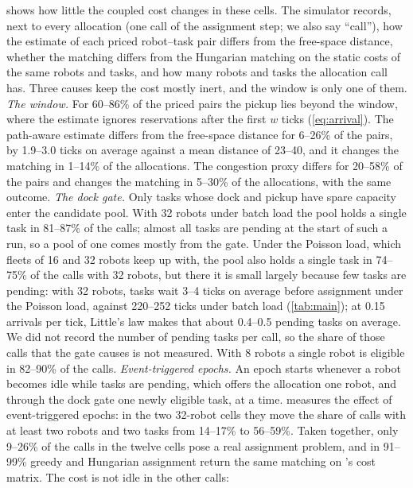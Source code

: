
 shows how little the coupled cost changes in these
cells. The simulator records, next to every allocation (one call of the assignment step; we also say
``call''), how the estimate of
each priced robot--task pair differs from the free-space distance, whether
the matching differs from the Hungarian matching on the static costs of the
same robots and tasks, and how many robots and tasks the allocation call has.
Three causes keep the cost mostly inert, and the window is only one of them.
\emph{The window.} For 60--86\% of the priced pairs the pickup lies
beyond the window, where the estimate ignores reservations after the first
$w$ ticks (\cref{eq:arrival}). The path-aware estimate differs from the
free-space distance for 6--26\% of the pairs, by 1.9--3.0 ticks on average
against a mean distance of 23--40, and it changes the matching in 1--14\% of
the allocations. The congestion proxy differs for 20--58\% of the pairs and
changes the matching in 5--30\% of the allocations, with the same outcome.
\emph{The dock gate.} Only tasks whose dock and pickup have spare
capacity enter the candidate pool. With 32 robots under batch load the pool holds
a single task in 81--87\% of the calls; almost all tasks are pending at the start
of such a run, so a pool of one comes mostly from the gate. Under the Poisson load,
which fleets of 16 and 32 robots keep up with, the pool also holds a single task
in 74--75\% of the calls with 32 robots, but there it is small largely because few
tasks are pending: with 32 robots, tasks wait 3--4 ticks on average before
assignment under the Poisson load, against 220--252 ticks under batch load
(\cref{tab:main}); at 0.15 arrivals per tick, Little's law makes that about 0.4--0.5 pending
tasks on average. We did not record the number of
pending tasks per call, so the share of those calls that the gate causes is not
measured. With 8 robots a
single robot is eligible in 82--90\% of the calls. \emph{Event-triggered epochs.} An epoch starts whenever a robot
becomes idle while tasks are pending, which offers the allocation one robot,
and through the dock gate one newly eligible task, at a time.
 measures the effect of event-triggered epochs: in the two 32-robot cells they move the
share of calls with at least two robots and two tasks from 14--17\% to 56--59\%.
Taken together, only 9--26\% of the calls in the twelve cells pose a real
assignment problem, and in 91--99\% greedy and Hungarian assignment return the
same matching on \sname's cost matrix. The cost is not idle in the other calls:
